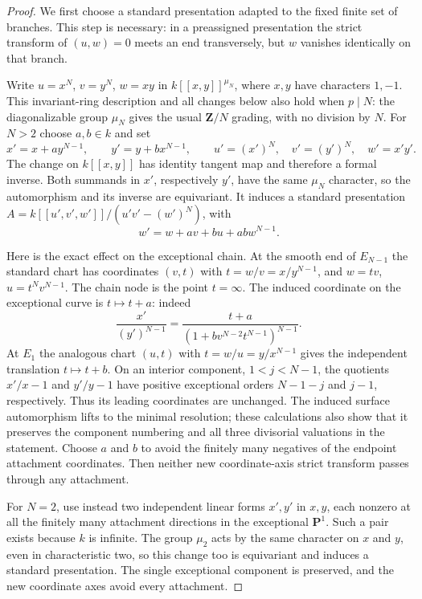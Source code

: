 \begin{proof}
We first choose a standard presentation adapted to the fixed finite
set of branches. This step is necessary: in a preassigned presentation
the strict transform of $(u,w)=0$ meets an end transversely, but $w$
vanishes identically on that branch.

Write $u=x^N$, $v=y^N$, $w=xy$ in
$k[[x,y]]^{\mu_N}$, where $x,y$ have characters $1,-1$.
This invariant-ring description and all changes below also hold when
$p\mid N$: the diagonalizable group $\mu_N$ gives the usual
$\mathbf Z/N$ grading, with no division by $N$.
For $N>2$ choose $a,b\in k$ and set
\[
 x'=x+a y^{N-1},\qquad y'=y+b x^{N-1},\qquad
 u'=(x')^N,\quad v'=(y')^N,\quad w'=x'y'.
                                                        \tag{D.JF.0}
\]
The change on $k[[x,y]]$ has identity tangent map and therefore a
formal inverse. Both summands in $x'$, respectively $y'$, have the
same $\mu_N$ character, so the automorphism and its inverse are
equivariant. It induces a standard presentation
$A=k[[u',v',w']]/(u'v'-(w')^N)$, with
\[
                  w'=w+a v+b u+ab w^{N-1}.
\]

Here is the exact effect on the exceptional chain. At the smooth end
of $E_{N-1}$ the standard chart has coordinates
$(v,t)$ with $t=w/v=x/y^{N-1}$, and
$w=tv$, $u=t^Nv^{N-1}$. The chain node is the point $t=\infty$.
The induced coordinate on the exceptional curve is $t\mapsto t+a$:
indeed
\[
 \frac{x'}{(y')^{N-1}}
       =\frac{t+a}{(1+bv^{N-2}t^{N-1})^{N-1}}.
\]
At $E_1$ the analogous chart $(u,t)$ with $t=w/u=y/x^{N-1}$
gives the independent translation $t\mapsto t+b$.
On an interior component, $1<j<N-1$, the quotients
$x'/x-1$ and $y'/y-1$ have positive exceptional orders
$N-1-j$ and $j-1$, respectively. Thus its leading coordinates
are unchanged. The induced surface automorphism lifts to the
minimal resolution; these calculations also show that it preserves
the component numbering and all three divisorial valuations in
the statement. Choose $a$ and $b$ to avoid the finitely many
negatives of the endpoint attachment coordinates. Then neither
new coordinate-axis strict transform passes through any attachment.

For $N=2$, use instead two independent linear forms $x',y'$ in
$x,y$, each nonzero at all the finitely many attachment directions
in the exceptional $\mathbf P^1$. Such a pair exists because $k$
is infinite. The group $\mu_2$ acts by the same character on $x$
and $y$, even in characteristic two, so this change too is
equivariant and induces a standard presentation. The single
exceptional component is preserved, and the new coordinate axes
avoid every attachment.


\end{proof}
